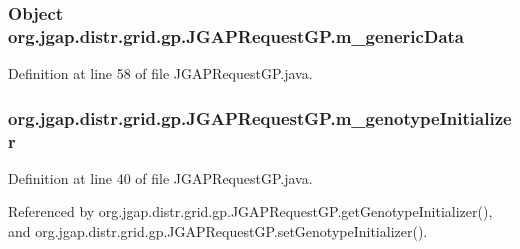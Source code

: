 \hypertarget{classorg_1_1jgap_1_1distr_1_1grid_1_1gp_1_1_j_g_a_p_request_g_p_a88d4babc1e8ebddea8e8e4110723cc3c}{
\subsubsection[{m\-\_\-generic\-Data}]{\setlength{\rightskip}{0pt plus 5cm}Object org.\-jgap.\-distr.\-grid.\-gp.\-J\-G\-A\-P\-Request\-G\-P.\-m\-\_\-generic\-Data\hspace{0.3cm}{\ttfamily [private]}}}\label{classorg_1_1jgap_1_1distr_1_1grid_1_1gp_1_1_j_g_a_p_request_g_p_a88d4babc1e8ebddea8e8e4110723cc3c}


Definition at line 58 of file J\-G\-A\-P\-Request\-G\-P.\-java.

\hypertarget{classorg_1_1jgap_1_1distr_1_1grid_1_1gp_1_1_j_g_a_p_request_g_p_aa7117a0cd7be0629bdb2e8bfee8ae746}{
\subsubsection[{m\-\_\-genotype\-Initializer}]{ org.\-jgap.\-distr.\-grid.\-gp.\-J\-G\-A\-P\-Request\-G\-P.\-m\-\_\-genotype\-Initializer\hspace{0.3cm}{\ttfamily [private]}}}\label{classorg_1_1jgap_1_1distr_1_1grid_1_1gp_1_1_j_g_a_p_request_g_p_aa7117a0cd7be0629bdb2e8bfee8ae746}


Definition at line 40 of file J\-G\-A\-P\-Request\-G\-P.\-java.



Referenced by org.\-jgap.\-distr.\-grid.\-gp.\-J\-G\-A\-P\-Request\-G\-P.\-get\-Genotype\-Initializer(), and org.\-jgap.\-distr.\-grid.\-gp.\-J\-G\-A\-P\-Request\-G\-P.\-set\-Genotype\-Initializer().

